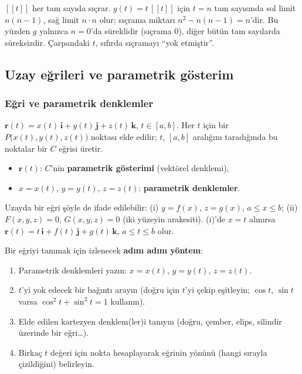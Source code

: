 \begin{bilgi}[Genelleme]
$[\![t]\!]$ her tam sayıda sıçrar. $g(t)=t\,[\![t]\!]$ için $t=n$ tam sayısında sol limit $n(n-1)$, sağ limit $n\cdot n$ olur;
sıçrama miktarı $n^2-n(n-1)=n$'dir. Bu yüzden $g$ yalnızca $n=0$'da süreklidir (sıçrama $0$), diğer bütün tam sayılarda süreksizdir.
Çarpandaki $t$, sıfırda sıçramayı ``yok etmiştir''.
\end{bilgi}

\subsection{Uzay eğrileri ve parametrik gösterim}

\subsubsection{Eğri ve parametrik denklemler}

\begin{tahta}
$\mathbf r(t)=x(t)\,\mathbf i+y(t)\,\mathbf j+z(t)\,\mathbf k$, $t\in[a,b]$. Her $t$ için bir $P\big(x(t),y(t),z(t)\big)$
noktası elde edilir; $t$, $[a,b]$ aralığını taradığında bu noktalar bir $C$ eğrisi üretir.
\begin{itemize}
\item $\mathbf r(t)$: $C$'nin \textbf{parametrik gösterimi} (vektörel denklemi),
\item $x=x(t)$, $y=y(t)$, $z=z(t)$: \textbf{parametrik denklemler}.
\end{itemize}
Uzayda bir eğri şöyle de ifade edilebilir:
(i) $y=f(x)$, $z=g(x)$, $a\le x\le b$; \quad (ii) $F(x,y,z)=0$, $G(x,y,z)=0$ (iki yüzeyin arakesiti).
(i)'de $x=t$ alınırsa $\mathbf r(t)=t\,\mathbf i+f(t)\,\mathbf j+g(t)\,\mathbf k$, $a\le t\le b$ olur.
\end{tahta}

Bir eğriyi tanımak için izlenecek \textbf{adım adım yöntem}:
\begin{enumerate}
\item Parametrik denklemleri yazın: $x=x(t)$, $y=y(t)$, $z=z(t)$.
\item $t$'yi yok edecek bir bağıntı arayın (doğru için $t$'yi çekip eşitleyin; $\cos t$, $\sin t$ varsa $\cos^2t+\sin^2t=1$ kullanın).
\item Elde edilen kartezyen denklem(ler)i tanıyın (doğru, çember, elips, silindir üzerinde bir eğri\dots).
\item Birkaç $t$ değeri için nokta hesaplayarak eğrinin yönünü (hangi sırayla çizildiğini) belirleyin.
\end{enumerate}

